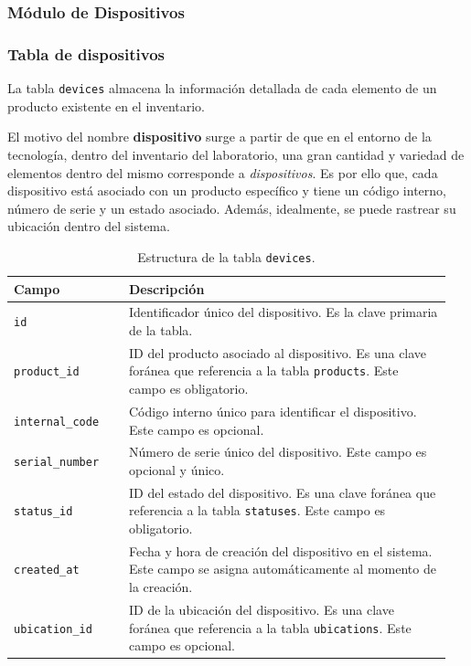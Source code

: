 \subsubsection{Módulo de Dispositivos}


\subsubsection*{Tabla de dispositivos}

La tabla \texttt{devices} almacena la información detallada de cada elemento de un producto existente en el inventario.

El motivo del nombre \textbf{dispositivo} surge a partir de que en el entorno de la tecnología, dentro del inventario del laboratorio, una gran cantidad y variedad de elementos dentro del mismo corresponde a \textit{dispositivos}. Es por ello que, cada dispositivo está asociado con un producto específico y tiene un código interno, número de serie y un estado asociado. Además, idealmente, se puede rastrear su ubicación dentro del sistema.

\begin{table}[H]
  \centering
  \begin{tabular}{|p{0.25\linewidth}|p{0.7\linewidth}|}
    \hline
    \textbf{Campo} & \textbf{Descripción} \\
    \hline
    \texttt{id} & Identificador único del dispositivo. Es la clave primaria de la tabla. \\
    \hline
    \texttt{product\_id} & ID del producto asociado al dispositivo. Es una clave foránea que referencia a la tabla \texttt{products}. Este campo es obligatorio. \\
    \hline
    \texttt{internal\_code} & Código interno único para identificar el dispositivo. Este campo es opcional. \\
    \hline
    \texttt{serial\_number} & Número de serie único del dispositivo. Este campo es opcional y único. \\
    \hline
    \texttt{status\_id} & ID del estado del dispositivo. Es una clave foránea que referencia a la tabla \texttt{statuses}. Este campo es obligatorio. \\
    \hline
    \texttt{created\_at} & Fecha y hora de creación del dispositivo en el sistema. Este campo se asigna automáticamente al momento de la creación. \\
    \hline
    \texttt{ubication\_id} & ID de la ubicación del dispositivo. Es una clave foránea que referencia a la tabla \texttt{ubications}. Este campo es opcional. \\
    \hline
  \end{tabular}
  \caption{Estructura de la tabla \texttt{devices}.}
  \label{tab:tabla_devices}
\end{table}


